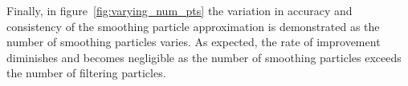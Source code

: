 \documentclass[10pt,twocolumn,twoside]{IEEEtran}
\begin{document}
%
%
%
%
Finally, in figure~\ref{fig:varying_num_pts} the variation in accuracy and consistency of the smoothing particle approximation is demonstrated as the number of smoothing particles varies. As expected, the rate of improvement diminishes and becomes negligible as the number of smoothing particles exceeds the number of filtering particles.
%
\end{document}
